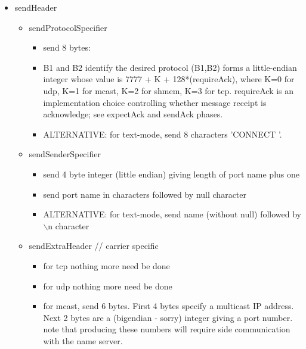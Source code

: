 \documentclass[a4]{article}
\newcommand{\packet}[1]{\framebox{#1}}
\begin{document}
\begin{itemize}

\item sendHeader
    
  \begin{itemize}

    \item sendProtocolSpecifier

      \begin{itemize}

      \item send 8 bytes: \packet{'Y' 'A' B1 B2 0 0 'R' 'P'}
      \item B1 and B2 identify the desired protocol
      (B1,B2) forms a little-endian integer whose value is
         7777 + K + 128*(requireAck),
      where K=0 for udp, K=1 for mcast, K=2 for shmem, K=3 for tcp.
      requireAck is an implementation choice controlling
      whether message receipt is acknowledge; see expectAck and sendAck
      phases.
    
      \item ALTERNATIVE: for text-mode, send 8 characters 'CONNECT '.
	
      \end{itemize}

    \item sendSenderSpecifier
      
      \begin{itemize}
      \item send 4 byte integer (little endian) giving length of port
      name plus one
      \item send port name in characters followed by null character
      \item ALTERNATIVE: for text-mode, send name (without null)
      followed by $\backslash$n character
      \end{itemize}

    \item sendExtraHeader      // carrier specific
      \begin{itemize}
	\item for tcp nothing more need be done
	\item for udp nothing more need be done
	\item for mcast, send 6 bytes.
         First 4 bytes specify a multicast IP address.
	 Next 2 bytes are a (bigendian - sorry) integer giving a port number.
         note that producing these numbers will require side communication
         with the name server.
      \end{itemize}
  \end{itemize}


\end{itemize}
\end{document}
